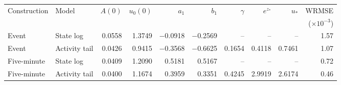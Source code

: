\begin{tabular}{llrrrrrrrr}
\toprule
Construction & Model & \(A(0)\) & \(u_0(0)\) & \(a_1\) & \(b_1\) & \(\gamma\) & \(e^{z_\ast}\) & \(u_\ast\) & WRMSE \\
 & & & & & & & & & (\(\times 10^{-3}\)) \\
\midrule
Event & State log & 0.0558 & 1.3749 & $-$0.0918 & $-$0.2569 & -- & -- & -- & 1.57 \\
Event & Activity tail & 0.0426 & 0.9415 & $-$0.3568 & $-$0.6625 & 0.1654 & 0.4118 & 0.7461 & 1.07 \\
\addlinespace
Five-minute & State log & 0.0409 & 1.2090 & 0.5181 & 0.5167 & -- & -- & -- & 0.72 \\
Five-minute & Activity tail & 0.0400 & 1.1674 & 0.3959 & 0.3351 & 0.4245 & 2.9919 & 2.6174 & 0.46 \\
\bottomrule
\end{tabular}
